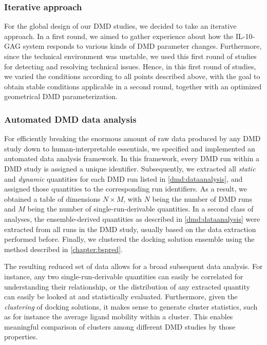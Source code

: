 \subsubsection{Iterative approach}

For the global design of our DMD studies, we decided to take an iterative
approach. In a first round, we aimed to gather experience about how the
IL-10-GAG system responds to various kinds of DMD parameter changes.
Furthermore, since the technical environment was unstable, we used this first
round of studies for detecting and resolving technical issues. Hence, in this
first round of studies, we varied the conditions according to all points
described above, with the goal to obtain stable conditions applicable in a
second round, together with an optimized geometrical DMD parameterization.


\subsubsection{Automated DMD data analysis}

For efficiently breaking the enormous amount of raw data produced by any DMD
study down to human-interpretable essentials, we specified and implemented an
automated data analysis framework. In this framework, every DMD run within a DMD
study is assigned a unique identifier. Subsequently, we extracted all
\textit{static} and \textit{dynamic} quantities for each DMD run listed in
\cref{dmd:dataanalysis}, and assigned those quantities to the corresponding
run identifiers. As a result, we obtained a table of dimensions $N \times M$,
with $N$ being the number of DMD runs and $M$ being the number of
single-run-derivable quantities. In a second class of analyses, the
ensemble-derived quantities as described in \cref{dmd:dataanalysis} were
extracted from all runs in the DMD study, usually based on the data extraction
performed before. Finally, we clustered the docking solution ensemble using the
method described in
\cref{chapter:bspred}.

The resulting reduced set of data allows for a broad subsequent data analysis.
For instance, any two single-run-derivable quantities can easily be correlated
for understanding their relationship, or the distribution of any extracted
quantity can easily be looked at and statistically evaluated. Furthermore, given
the \textit{clustering} of docking solutions, it makes sense to generate cluster
statistics, such as for instance the average ligand mobility within a cluster.
This enables meaningful comparison of clusters among different DMD studies by
those properties.


